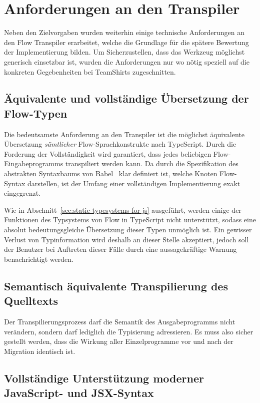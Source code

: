 \section{Anforderungen an den Transpiler}

Neben den Zielvorgaben wurden weiterhin einige technische Anforderungen an den Flow Transpiler erarbeitet, welche die Grundlage für die spätere Bewertung der Implementierung bilden. Um Sicherzustellen, dass das Werkzeug möglichst generisch einsetzbar ist, wurden die Anforderungen nur wo nötig speziell auf die konkreten Gegebenheiten bei TeamShirts zugeschnitten.

\subsection{Äquivalente und vollständige Übersetzung der Flow-Typen}
\label{subsection:requirement:correct-translation}

Die bedeutsamste Anforderung an den Transpiler ist die möglichst äquivalente Übersetzung \emph{sämtlicher} Flow-Sprachkonstrukte nach TypeScript. Durch die Forderung der Vollständigkeit wird garantiert, dass jedes beliebigen Flow-Eingabeprogramms transpiliert werden kann. Da durch die Spezifikation des abstrakten Syntaxbaums von Babel~\autocite{BABEL:PARSER_SPEC} klar definiert ist, welche Knoten Flow-Syntax darstellen, ist der Umfang einer vollständigen Implementierung exakt eingegrenzt.

Wie in Abschnitt~\ref{sec:static-typesystems-for-js} ausgeführt, werden einige der Funktionen des Typsystems von Flow in TypeScript nicht unterstützt, sodass eine absolut bedeutungsgleiche Übersetzung dieser Typen unmöglich ist. Ein gewisser Verlust von Typinformation wird deshalb an dieser Stelle akzeptiert, jedoch soll der Benutzer bei Auftreten dieser Fälle durch eine aussagekräftige Warnung benachrichtigt werden.

\subsection{Semantisch äquivalente Transpilierung des Quelltexts}
\label{subsection:requirement:semantic-equivalence}

Der Transpilierungsprozess darf die Semantik des Ausgabeprogramms nicht verändern, sondern darf lediglich die Typisierung adressieren. Es muss also sicher gestellt werden, dass die Wirkung aller Einzelprogramme vor und nach der Migration identisch ist.

\subsection{Vollständige Unterstützung moderner JavaScript- und JSX-Syntax}
\label{subsection:requirement:modern-js-support}

